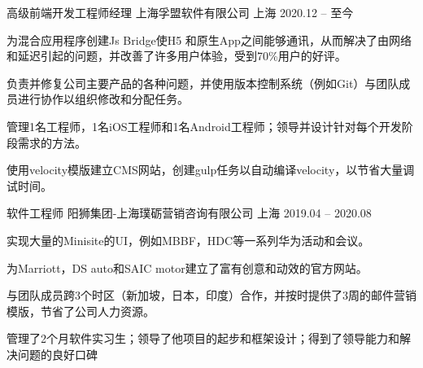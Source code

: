 
\begin{cventries}

  \cventry
    {高级前端开发工程师经理} %
    { 上海孚盟软件有限公司} %
    {上海} %
    {2020.12 -- 至今 } %
    {
      \begin{cvitems} %
        \item{为混合应用程序创建Js Bridge使H5 和原生App之间能够通讯，从而解决了由网络和延迟引起的问题，并改善了许多用户体验，受到70\%用户的好评。}
        \item{负责并修复公司主要产品的各种问题，并使用版本控制系统（例如Git）与团队成员进行协作以组织修改和分配任务。}
        \item{管理1名工程师，1名iOS工程师和1名Android工程师；领导并设计针对每个开发阶段需求的方法。}
        \item{使用velocity模版建立CMS网站，创建gulp任务以自动编译velocity，以节省大量调试时间。}
      \end{cvitems}
    }

  \cventry
    {软件工程师} %
    { 阳狮集团-上海璞砺营销咨询有限公司} %
    {上海} %
    {2019.04 -- 2020.08} %
    {
      \begin{cvitems} %
        \item{实现大量的Minisite的UI，例如MBBF，HDC等一系列华为活动和会议。}
        \item{为Marriott，DS auto和SAIC motor建立了富有创意和动效的官方网站。}
        \item{与团队成员跨3个时区（新加坡，日本，印度）合作，并按时提供了3周的邮件营销模版，节省了公司人力资源。}
        \item{管理了2个月软件实习生；领导了他项目的起步和框架设计；得到了领导能力和解决问题的良好口碑}
      \end{cvitems}
    }

\end{cventries}
